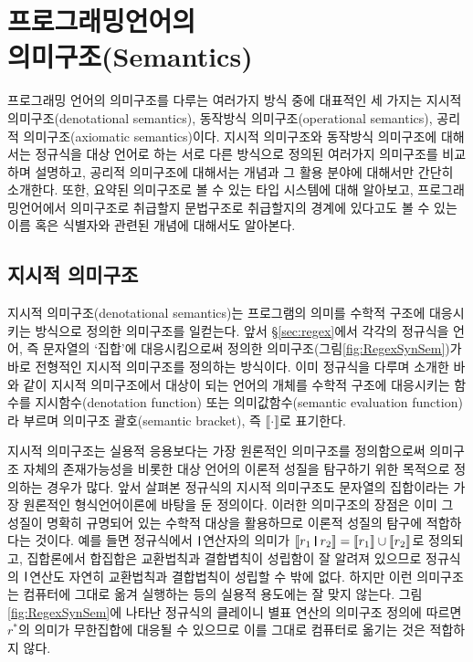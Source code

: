 \documentclass[b5paper,chapter,figtabcapt]{oblivoir}
\newcommand{\VERT}{\ensuremath{\mathop{\!\resizebox{1.65ex}{.7em}{\texttt{|}}\!}}}
\begin{document}
\chapter[프로그래밍언어의 의미구조(Semantics)]{프로그래밍언어의\\의미구조(Semantics)}

프로그래밍 언어의 의미구조를 다루는 여러가지 방식 중에 대표적인
세 가지는 지시적 의미구조(denotational semantics),
동작방식 의미구조(operational semantics),
공리적 의미구조(axiomatic semantics)이다.
지시적 의미구조와 동작방식 의미구조에 대해서는 정규식을 대상 언어로 하는
서로 다른 방식으로 정의된 여러가지 의미구조를 비교하며 설명하고,
공리적 의미구조에 대해서는 개념과 그 활용 분야에 대해서만 간단히 소개한다.
또한, 요약된 의미구조로 볼 수 있는 타입 시스템에 대해 알아보고,
프로그래밍언어에서 의미구조로 취급할지 문법구조로 취급할지의 경계에
있다고도 볼 수 있는 이름 혹은 식별자와 관련된 개념에 대해서도 알아본다.

\newpage

\section{지시적 의미구조}
지시적 의미구조(denotational semantics)는 프로그램의 의미를 수학적 구조에
대응시키는 방식으로 정의한 의미구조를 일컫는다. 앞서 \S\ref{sec:regex}에서
각각의 정규식을 언어, 즉 문자열의 `집합'에 대응시킴으로써 정의한 
의미구조(그림\;\ref{fig:RegexSynSem})가 바로 전형적인 지시적 의미구조를
정의하는 방식이다. 이미 정규식을 다루며 소개한 바와 같이 지시적 의미구조에서
대상이 되는 언어의 개체를 수학적 구조에 대응시키는 함수를 지시함수(denotation function)
또는 의미값함수(semantic evaluation function)라 부르며 의미구조 괄호(semantic bracket),
즉 $\llbracket\cdot\rrbracket$로 표기한다.

지시적 의미구조는 실용적 응용보다는 가장 원론적인 의미구조를 정의함으로써
의미구조 자체의 존재가능성을 비롯한 대상 언어의 이론적 성질을 탐구하기 위한
목적으로 정의하는 경우가 많다. 앞서 살펴본 정규식의 지시적 의미구조도
문자열의 집합이라는 가장 원론적인 형식언어이론에 바탕을 둔 정의이다.
이러한 의미구조의 장점은 이미 그 성질이 명확히 규명되어 있는 수학적 대상을
활용하므로 이론적 성질의 탐구에 적합하다는 것이다. 예를 들면
정규식에서 \VERT 연산자의 의미가 $ \llbracket r_1\VERT r_2\rrbracket
= \llbracket r_1\rrbracket\cup\llbracket r_2\rrbracket$로 정의되고,
집합론에서 합집합은 교환법칙과 결합볍칙이 성립함이 잘 알려져 있으므로
정규식의 \VERT 연산도 자연히 교환법칙과 결합법칙이 성립할 수 밖에 없다.
하지만 이런 의미구조는 컴퓨터에 그대로 옮겨 실행하는 등의 실용적 용도에는
잘 맞지 않는다. 그림\;\ref{fig:RegexSynSem}에 나타난 정규식의
클레이니 별표 연산의 의미구조 정의에 따르면 $r^{*}$의 의미가 무한집합에
대응될 수 있으므로 이를 그대로 컴퓨터로 옮기는 것은 적합하지 않다.
\end{document}

